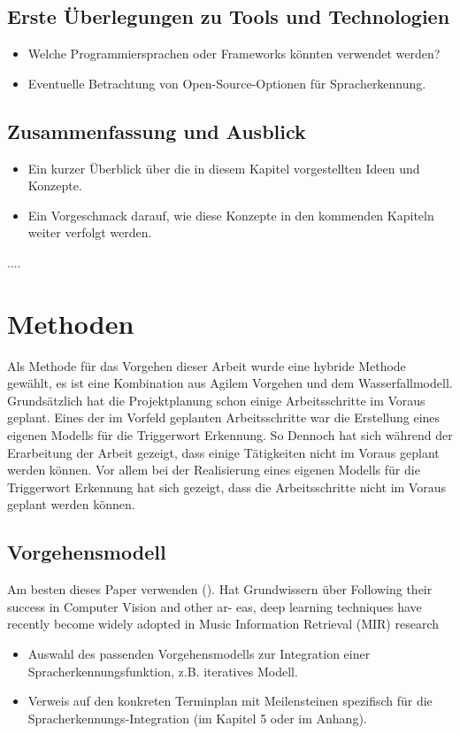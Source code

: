 \documentclass[11pt,a4paper]{article}
\begin{document}
\subsection{Erste Überlegungen zu Tools und Technologien}
\begin{itemize}
	\item Welche Programmiersprachen oder Frameworks könnten verwendet werden?
	\item Eventuelle Betrachtung von Open-Source-Optionen für Spracherkennung.
\end{itemize}

\subsection{Zusammenfassung und Ausblick}
\begin{itemize}
	\item Ein kurzer Überblick über die in diesem Kapitel vorgestellten Ideen und Konzepte.
	\item Ein Vorgeschmack darauf, wie diese Konzepte in den kommenden Kapiteln weiter verfolgt werden.
\end{itemize}


....

\newpage \section{Methoden}
Als Methode für das Vorgehen dieser Arbeit wurde eine hybride Methode gewählt, es ist eine 
Kombination aus Agilem Vorgehen und dem Wasserfallmodell. Grundsätzlich hat die Projektplanung 
schon einige Arbeitsschritte im Voraus geplant. Eines der im Vorfeld geplanten Arbeitsschritte war 
die Erstellung eines eigenen Modells für die Triggerwort Erkennung. So Dennoch hat sich während der 
Erarbeitung der Arbeit gezeigt, dass einige Tätigkeiten nicht im Voraus geplant werden können.
Vor allem bei der Realisierung eines eigenen Modells für die Triggerwort Erkennung hat sich
gezeigt, dass die Arbeitsschritte nicht im Voraus geplant werden können.

\subsection{Vorgehensmodell}
Am besten dieses Paper verwenden (\cite{choi2018tutorial}). Hat Grundwissern über 
Following their success in Computer Vision and other ar- eas, deep learning techniques have 
recently become widely adopted in Music Information Retrieval (MIR) research
\begin{itemize}
	\item Auswahl des passenden Vorgehensmodells zur Integration einer Spracherkennungsfunktion, z.B. iteratives Modell.
	\item Verweis auf den konkreten Terminplan mit Meilensteinen spezifisch für die Spracherkennungs-Integration (im Kapitel 5 oder im Anhang).
\end{itemize}
\end{document}
